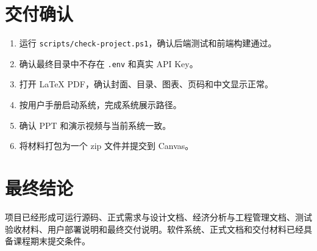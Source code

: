 \documentclass[12pt,a4paper]{ctexart}
\newcommand{\code}[1]{{\footnotesize\nolinkurl{#1}}}
\begin{document}
\section{交付确认}
\begin{enumerate}
    \item 运行 \code{scripts/check-project.ps1}，确认后端测试和前端构建通过。
    \item 确认最终目录中不存在 \code{.env} 和真实 API Key。
    \item 打开 LaTeX PDF，确认封面、目录、图表、页码和中文显示正常。
    \item 按用户手册启动系统，完成系统展示路径。
    \item 确认 PPT 和演示视频与当前系统一致。
    \item 将材料打包为一个 zip 文件并提交到 Canvas。
\end{enumerate}

\section{最终结论}
项目已经形成可运行源码、正式需求与设计文档、经济分析与工程管理文档、测试验收材料、用户部署说明和最终交付说明。软件系统、正式文档和交付材料已经具备课程期末提交条件。
\end{document}
